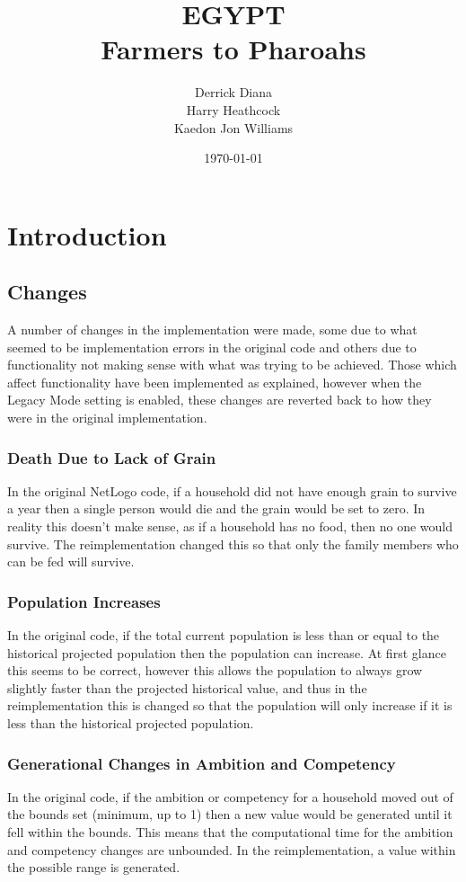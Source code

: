 \documentclass[12pt]{article}
\title{EGYPT\\Farmers to Pharoahs}
\author{Derrick Diana\\Harry Heathcock\\Kaedon Jon Williams}
\date{\today}
\begin{document}
	\maketitle
	\begin{abstract}
			
	\end{abstract}
	
	\section{Introduction}
		\subsection{Changes}
			A number of changes in the implementation were made, some due to what seemed to be implementation errors in the original code and others due to functionality not making sense with what was trying to be achieved. Those which affect functionality have been implemented as explained, however when the Legacy Mode setting is enabled, these changes are reverted back to how they were in the original implementation.
			\subsubsection{Death Due to Lack of Grain}
				In the original NetLogo code, if a household did not have enough grain to survive a year then a single person would die and the grain would be set to zero. In reality this doesn't make sense, as if a household has no food, then no one would survive. The reimplementation changed this so that only the family members who can be fed will survive.\\
			\subsubsection{Population Increases}
				In the original code, if the total current population is less than or equal to the historical projected population then the population can increase. At first glance this seems to be correct, however this allows the population to always grow slightly faster than the projected historical value, and thus in the reimplementation this is changed so that the population will only increase if it is less than the historical projected population.\\
			\subsubsection{Generational Changes in Ambition and Competency}
				In the original code, if the ambition or competency for a household moved out of the bounds set (minimum, up to 1) then a new value would be generated until it fell within the bounds. This means that the computational time for the ambition and competency changes are unbounded. In the reimplementation, a value within the possible range is generated.\\
\end{document}
